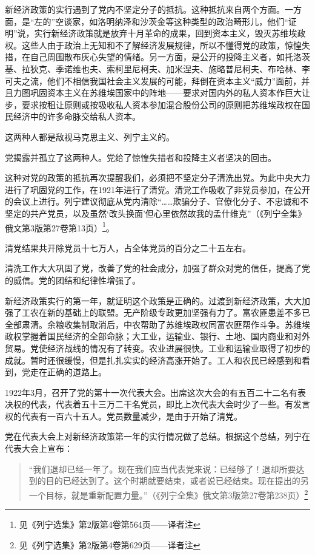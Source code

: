 新经济政策的实行遇到了党内不坚定分子的抵抗。这种抵抗来自两个方面。一方面，是“左的”空谈家，如洛明纳泽和沙茨金等这种类型的政治畸形儿，他们“证明”说，实行新经济政策就是放弃十月革命的成果，回到资本主义，毁灭苏维埃政权。这些人由于政治上无知和不了解经济发展规律，所以不懂得党的政策，惊惶失措，在自己周围散布灰心失望的情绪。另一方面，是公开的投降主义者，如托洛茨基、拉狄克、季诺维也夫、索柯里尼柯夫、加米涅夫、施略普尼柯夫、布哈林、李可夫之流，他们不相信我国社会主义发展的可能，拜倒在资本主义“威力”面前，并且力图巩固资本主义在苏维埃国家中的阵地——要求对国内外的私人资本作巨大让步，要求按租让原则或按吸收私人资本参加混合股份公司的原则把苏维埃政权在国民经济中的许多命脉交给私人资本。

这两种人都是敌视马克思主义、列宁主义的。

党揭露并孤立了这两种人。党给了惊惶失措者和投降主义者坚决的回击。

这种对党的政策的抵抗再次提醒我们，必须把不坚定分子清洗出党。为此中央大力进行了巩固党的工作，在1921年进行了清党。清党工作吸收了非党员参加，在公开的会议上进行。列宁建议彻底从党内清除“……欺骗分子、官僚化分子、不忠诚和不坚定的共产党员，以及虽然‘改头换面’但心里依然故我的孟什维克”（《列宁全集》俄文第3版第27卷第13页）\footnote{见《列宁选集》第2版第4卷第564页——译者注}。

清党结果共开除党员十七万人，占全体党员的百分之二十五左右。

清洗工作大大巩固了党，改善了党的社会成分，加强了群众对党的信任，提高了党的威信。党的团结和纪律性增强了。

新经济政策实行的第一年，就证明这个政策是正确的。过渡到新经济政策，大大加强了工农在新的基础上的联盟。无产阶级专政更加坚强有力了。富农匪患差不多已全部肃清。余粮收集制取消后，中农帮助了苏维埃政权同富农匪帮作斗争。苏维埃政权掌握着国民经济的全部命脉；大工业，运输业、银行、土地、国内商业和对外贸易。党使经济战线的情况有了转变。农业进展很快。工业和运输业取得了初步的成就。暂时还很缓慢，但是扎扎实实的经济高涨开始了。工人和农民已经感到和看到，党走在正确的道路上。

1922年3月，召开了党的第十一次代表大会。出席这次大会的有五百二十二名有表决权的代表，代表着五十三万二干名党员，即比上次代表大会时少了一些。有发言权的代表有一百六十五人。党员数量减少，是由于开始了清党。

党在代表大会上对新经济政策第一年的实行情况做了总结。根据这个总结，列宁在代表大会上宣布：

\begin{quotation}
“我们退却已经一年了。现在我们应当代表党来说：已经够了！退却所要达到的目的已经达到了。这个时期就要结束，或者说已经结束。现在提出的另一个目标，就是重新配置力量。”（《列宁全集》俄文第3版第27卷第238页）\footnote{见《列宁选集》第2版第4卷第629页——译者注}
\end{quotation}

